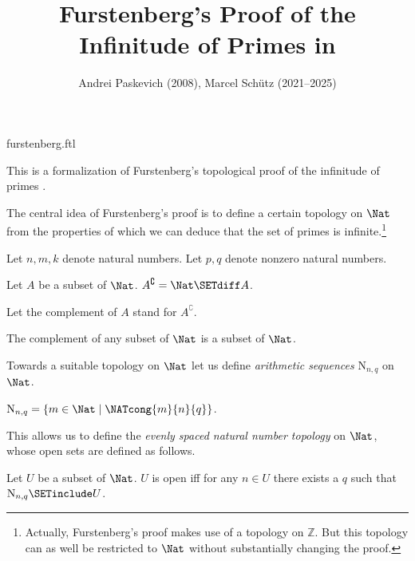 \documentclass{article}
\title{Furstenberg's Proof of the Infinitude of Primes in \Naproche}
\author{Andrei Paskevich (2008), Marcel Schütz (2021--2025)}
\date{}
\newcommand{\N}{\mathrm{N}}
\newcommand{\Int}{\mathbb{Z}}
\begin{document}
\begin{smodule}{furstenberg.ftl}
\maketitle


\noindent This is a formalization of Furstenberg's topological proof of the
infinitude of primes \cite[p. 353]{Furstenberg1955}.

The central idea of Furstenberg's proof is to define a certain topology on
$\Nat$ from the properties of which we can deduce that the set of
primes is infinite.\footnote{Actually, Furstenberg's proof makes use of a
topology on $\Int$. But this topology can as well be restricted to
$\Nat$ without substantially changing the proof.}

\begin{forthel}
  Let $n, m, k$ denote natural numbers.
  Let $p, q$ denote nonzero natural numbers.

  \begin{definition}
    Let $A$ be a subset of $\Nat$.
    $A^\complement = \Nat \SETdiff A$.
  \end{definition}

  Let the complement of $A$ stand for $A^\complement$.

  \begin{lemma}
    The complement of any subset of $\Nat$ is a subset of $\Nat$.
  \end{lemma}
\end{forthel}

Towards a suitable topology on $\Nat$ let us define \textit{arithmetic
sequences} $\N_{n, q}$ on $\Nat$.

\begin{forthel}
  \begin{definition}
    $\N_{n, q} = \{ m \in \Nat \mid \NATcong{m}{n}{q} \}$.
  \end{definition}
\end{forthel}

This allows us to define the \textit{evenly spaced natural number
topology} on $\Nat$, whose open sets are defined as follows.

\begin{forthel}
  \begin{definition}
    Let $U$ be a subset of $\Nat$.
    $U$ is open iff for any $n \in U$ there exists a $q$ such that
    $\N_{n, q} \SETinclude U$.
  \end{definition}


\end{forthel}
\end{smodule}
\end{document}
